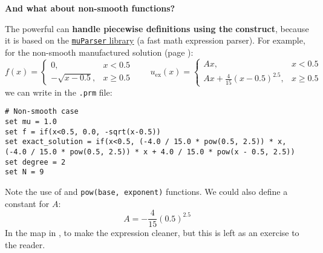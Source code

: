 \begin{flushleft}
    \textcolor{Green3}{ \textbf{And what about non-smooth functions?}}
\end{flushleft}
The powerful  can \textbf{handle piecewise definitions using the}  \textbf{construct}, because it is based on the \href{https://muparser.beltoforion.de/}{\texttt{muParser} library} (a fast math expression parser). For example, for the non-smooth manufactured solution (page \pageref{sec:non-smooth-manufactured-case}):
\begin{equation*}
    f(x) = \begin{cases}
        0, & x < 0.5 \\
        -\sqrt{x - 0.5}, & x \geq 0.5
    \end{cases}
    \quad\quad
    u_{\text{ex}}(x) = \begin{cases}
        A x, & x < 0.5 \\
        A x + \frac{4}{15} (x - 0.5)^{2.5}, & x \geq 0.5
    \end{cases}
\end{equation*}
we can write in the \texttt{.prm} file:
\begin{lstlisting}[language=prm]
# Non-smooth case
set mu = 1.0
set f = if(x<0.5, 0.0, -sqrt(x-0.5))
set exact_solution = if(x<0.5, (-4.0 / 15.0 * pow(0.5, 2.5)) * x, (-4.0 / 15.0 * pow(0.5, 2.5)) * x + 4.0 / 15.0 * pow(x - 0.5, 2.5))
set degree = 2
set N = 9\end{lstlisting}
Note the use of  and \texttt{pow\break (base, exponent)} functions. We could also define a constant for $A$:
\begin{equation*}
    A = -\frac{4}{15} (0.5)^{2.5}
\end{equation*}
In the  map in , to make the expression cleaner, but this is left as an exercise to the reader.   